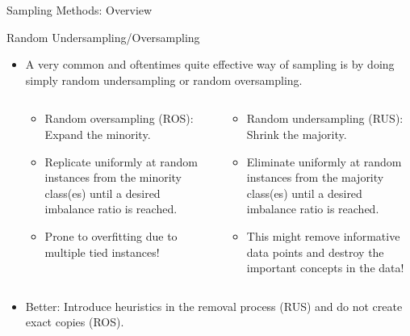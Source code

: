 \begin{frame}{Sampling Methods: Overview}
	\end{frame}
	
	\begin{frame}{Random Undersampling/Oversampling}
		\begin{small}
		\begin{itemize}
%			
			\item A very common and oftentimes quite effective way of sampling is by doing simply random undersampling or random oversampling.
			
			\begin{columns}
				\footnotesize
				\begin{column}{0.45\textwidth}
					\begin{itemize}\small
						\item Random oversampling (ROS): Expand the minority.
						\item Replicate uniformly at random instances from the minority class(es) until a desired imbalance ratio is reached.
						\item Prone to overfitting due to multiple tied instances!
					\end{itemize}
				\end{column}
				\begin{column}{0.45\textwidth}
					\begin{itemize}\small
						\item Random undersampling (RUS): Shrink the majority.
						 \item Eliminate uniformly at random instances from the majority class(es) until a desired imbalance ratio is reached.
						 \item This might remove informative data points and destroy the important concepts in the data!
					\end{itemize}
				\end{column}
			\end{columns}
%			
			\item Better: Introduce heuristics in the removal process (RUS) and do not create exact copies (ROS).
%			
			\end{itemize}
		\end{small}	
%
	\end{frame}
	
